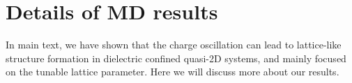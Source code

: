 \documentclass[aps,prl,reprint,showpacs,floatfix,superscriptaddress, onecolumn]{revtex4-2}
\begin{document}





\section{Details of MD results}

In main text, we have shown that the charge oscillation can lead to lattice-like structure formation in dielectric confined quasi-2D systems, and mainly focused on the tunable lattice parameter.
Here we will discuss more about our results.
\end{document}
